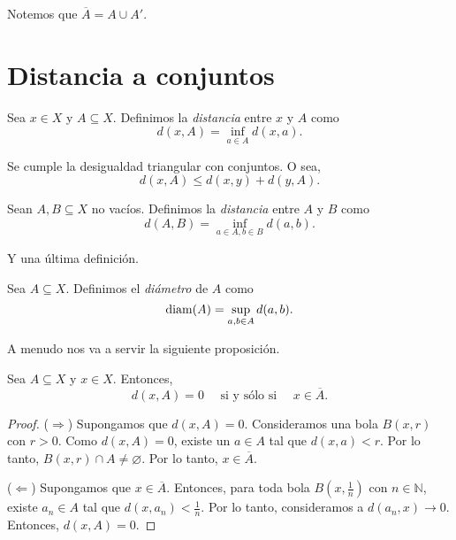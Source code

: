 \begin{center}
	
\end{center}

\begin{remark}
	Notemos que $\overline{A} = A \cup A'$.
\end{remark}


\section{Distancia a conjuntos}

\begin{definition}
	Sea $x \in X$ y $A \subseteq X$. Definimos la \emph{distancia} entre $x$ y $A$ como
	$$
		d(x, A) = \inf_{a \in A} d(x, a).
	$$
\end{definition}

\begin{remark}
	Se cumple la desigualdad triangular con conjuntos. O sea,
	$$
		d(x, A) \leq d(x, y) + d(y, A).
	$$
\end{remark}

\begin{definition}
	Sean $A, B \subseteq X$ no vacíos. Definimos la \emph{distancia} entre $A$ y $B$ como
	$$
		d(A, B) = \inf_{a \in A, b \in B} d(a, b).
	$$
\end{definition}

Y una última definición.

\begin{definition}
	Sea $A \subseteq X$. Definimos el \emph{diámetro} de $A$ como
	$$
		\operatorname{diam}(A) = \sup_{a, b \in A} d(a, b).
	$$
\end{definition}

A menudo nos va a servir la siguiente proposición.

\begin{proposition}
	Sea $A \subseteq X$ y $x \in X$. Entonces,
	\begin{equation*}
		d(x, A) = 0 \quad \text{ si y sólo si } \quad x \in \overline{A}.
	\end{equation*}
\end{proposition}

\begin{proof}
	($\Rightarrow$) Supongamos que $d(x, A) = 0$. Consideramos una bola $B(x, r)$ con $r > 0$. Como $d(x, A) = 0$, existe un $a \in A$ tal que $d(x, a) < r$. Por lo tanto, $B(x, r) \cap A \neq \varnothing$. Por lo tanto, $x \in \overline{A}$.

	($\Leftarrow$) Supongamos que $x \in \overline{A}$. Entonces, para toda bola $B(x, \frac{1}{n})$ con $n \in \mathbb{N}$, existe $a_n \in A$ tal que $d(x, a_n) < \frac{1}{n}$. Por lo tanto, consideramos a $d(a_n, x) \longrightarrow 0$. Entonces, $d(x, A) = 0$.
\end{proof}


